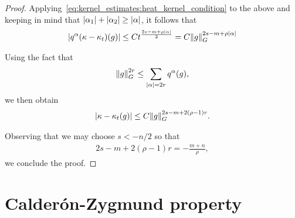 \begin{proof}
    Applying~\eqref{eq:kernel_estimates:heat_kernel_condition} to the above
    and keeping in mind that $\abs {\alpha_1} + \abs {\alpha_2} \geq \abs \alpha$,
    it follows that
    \begin{align*}
        \abs {q^\alpha (\kappa - \kappa_t)(g)}
        \leq C t^{\frac {2s - m + \rho \abs \alpha} 2}
        = C \norm [\Group] g^{2s - m + \rho \abs \alpha}
    \end{align*}

    Using the fact that
    \begin{align*}
        \norm [\Group] g^{2 r}
        \leq \sum_{\abs \alpha = 2r} q^\alpha(g),
    \end{align*}
    we then obtain
    \begin{align*}
        \abs {\kappa - \kappa_t(g)}
        \leq C \norm [\Group] g^{2s - m + 2 (\rho - 1) r}.
    \end{align*}

    Observing that we may choose $s < -n/2$ so that
    \begin{align*}
        2s - m + 2 (\rho - 1) r = - \frac {m + n} \rho,
    \end{align*}
    we conclude the proof.
\end{proof}

\section{Calder\'on-Zygmund property}
